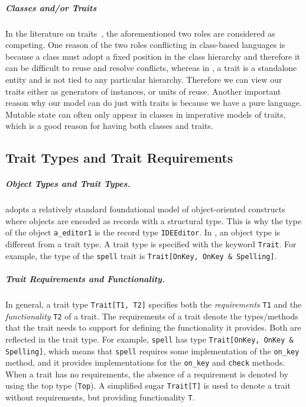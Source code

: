 \subparagraph{Classes and/or Traits}

In the literature on traits~\cite{Ducasse_2006, scharli2003traits}, the
aforementioned two roles are considered as competing. One reason of the two
roles conflicting in class-based languages is because a class must adopt a fixed
position in the class hierarchy and therefore it can be difficult to reuse and
resolve conflicts, whereas in \name, a trait is a standalone entity and is not
tied to any particular hierarchy. Therefore we can view our traits either as
generators of instances, or units of reuse. Another important reason why our
model can do just with traits is because we have a pure language. Mutable state
can often only appear in classes in imperative models of traits, which is a good
reason for having both classes and traits.





\subsection{Trait Types and Trait Requirements}

\subparagraph{Object Types and Trait Types.}
\name adopts a relatively standard foundational model of object-oriented
constructs~\cite{DBLP:conf/ecoop/LeeASP15} where objects are encoded as records
with a structural type. This is why the type of the object \lstinline{a_editor1}
is the record type \lstinline{IDEEditor}. In \name, an object type is
different from a trait type. A trait type is specified with the keyword
\lstinline{Trait}. For example, the type of the \lstinline{spell} trait is
\lstinline{Trait[OnKey, OnKey & Spelling]}. 

\subparagraph{Trait Requirements and Functionality.}
In general, a trait type
\lstinline{Trait[T1, T2]} specifies both the \emph{requirements} \lstinline{T1}
and the \emph{functionality} \lstinline{T2} of a trait. The requirements of a trait denote the types/methods that the
trait needs to support for defining the functionality it provides. Both are
reflected in the trait type. For example, \lstinline{spell} has type
\lstinline{Trait[OnKey, OnKey & Spelling]}, which means that \lstinline{spell}
requires some implementation of the \lstinline{on_key} method, and it provides
implementations for the \lstinline{on_key} and \lstinline{check} methods.
When a trait
has no requirements, the absence of a requirement is denoted by using
the top type (\lstinline{Top}). A simplified sugar \lstinline{Trait[T]} is
used to denote a trait without requirements, but providing functionality \lstinline{T}.

